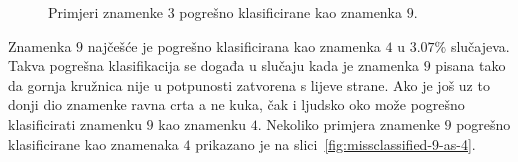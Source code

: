 \begin{figure}[htb]
    \centering
    \caption{Primjeri znamenke $3$ pogrešno klasificirane kao znamenka $9$.}
    \label{fig:missclassified-3-as-9}
\end{figure}
Znamenka $9$ najčešće je pogrešno klasificirana kao znamenka $4$ u $3.07\%$ slučajeva. Takva pogrešna klasifikacija se
događa u slučaju kada je znamenka $9$ pisana tako da gornja kružnica nije u potpunosti zatvorena s lijeve strane.
Ako je još uz to donji dio znamenke ravna crta a ne kuka, čak i ljudsko oko može pogrešno klasificirati znamenku $9$
kao znamenku $4$. Nekoliko primjera znamenke $9$ pogrešno klasificirane kao znamenaka $4$ prikazano je na
slici\ \ref{fig:missclassified-9-as-4}.
